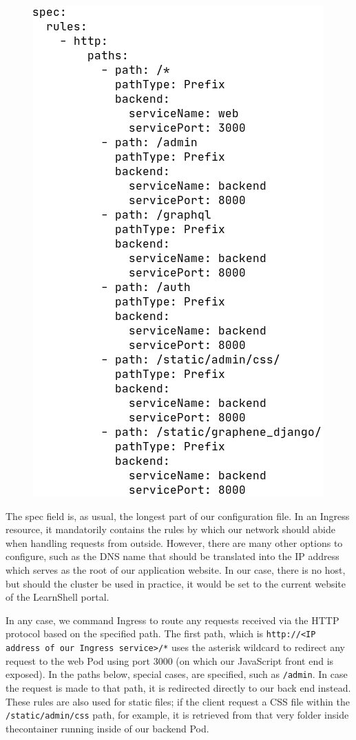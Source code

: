 \documentclass[thesis=B,english]{FITthesis}[2019/12/23]
\begin{document}
\begin{figure}[H]
\centering
\hspace*{0.7cm}
\includegraphics[scale=0.5]{kube-ingress2}
\end{figure}

The spec field is, as usual, the longest part of our configuration file. In an Ingress resource, it mandatorily contains the rules by which our network should abide when handling requests from outside. However, there are many other options to configure, such as the DNS name that should be translated into the IP address which serves as the root of our application website. In our case, there is no host, but should the cluster be used in practice, it would be set to the current website of the LearnShell portal.

In any case, we command Ingress to route any requests received via the HTTP protocol based on the specified path. The first path, which is \verb|http://<IP address of our Ingress service>/*| uses the asterisk wildcard to redirect any request to the web Pod using port 3000 (on which our JavaScript front end is exposed). In the paths below, special cases, are specified, such as \verb|/admin|. In case the request is made to that path, it is redirected directly to our back end instead. These rules are also used for static files; if the client request a CSS file within the \verb|/static/admin/css| path, for example, it is retrieved from that very folder inside thecontainer running inside of our backend Pod.
\end{document}
